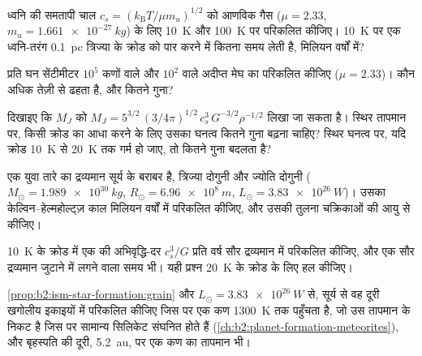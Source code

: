\begin{exercise}[$\star$]\label{exo:b2:ism-star-formation:3}
ध्वनि की समतापी चाल $c_s = (k_{\mathrm B}T/\mu m_u)^{1/2}$ को आणविक गैस
($\mu = 2.33$, $m_u = \qty{1.661e-27}{kg}$) के लिए \qty{10}{K} और \qty{100}{K} पर परिकलित कीजिए।
\qty{10}{K} पर एक ध्वनि-तरंग \qty{0.1}{pc} त्रिज्या के क्रोड को पार करने में
कितना समय लेती है, मिलियन वर्षों में?
\end{exercise}

\begin{exercise}[$\star$]\label{exo:b2:ism-star-formation:4}
प्रति घन सेंटीमीटर $10^5$ कणों वाले  और $10^2$ वाले अदीप्त
मेघ का  परिकलित कीजिए ($\mu = 2.33$)। कौन अधिक तेज़ी से ढहता है,
और कितने गुना?
\end{exercise}

\begin{exercise}[$\star\star$]\label{exo:b2:ism-star-formation:5}
दिखाइए कि $M_J$ को $M_J = 5^{3/2}\,(3/4\pi)^{1/2}\,c_s^3\,G^{-3/2}\rho^{-1/2}$ लिखा जा सकता है।
स्थिर तापमान पर, किसी क्रोड का  आधा करने के लिए उसका घनत्व कितने गुना बढ़ना चाहिए?
स्थिर घनत्व पर, यदि क्रोड \qty{10}{K} से \qty{20}{K} तक गर्म हो जाए, तो
 कितने गुना बदलता है?
\end{exercise}

\begin{exercise}[$\star\star$]\label{exo:b2:ism-star-formation:6}
एक युवा तारे का द्रव्यमान सूर्य के बराबर है, त्रिज्या दोगुनी और ज्योति दोगुनी
($M_\odot = \qty{1.989e30}{kg}$, $R_\odot = \qty{6.96e8}{m}$,
$L_\odot = \qty{3.83e26}{W}$)। उसका केल्विन--हेल्महोल्ट्ज़ काल मिलियन वर्षों में
परिकलित कीजिए, और उसकी तुलना चक्रिकाओं की आयु से कीजिए।
\end{exercise}

\begin{exercise}[$\star\star$]\label{exo:b2:ism-star-formation:7}
\qty{10}{K} के क्रोड में एक  की अभिवृद्धि-दर $c_s^3/G$ प्रति वर्ष सौर द्रव्यमान में
परिकलित कीजिए, और एक सौर द्रव्यमान जुटाने में लगने वाला समय भी। यही
प्रश्न \qty{20}{K} के क्रोड के लिए हल कीजिए।
\end{exercise}

\begin{exercise}[$\star\star$]\label{exo:b2:ism-star-formation:8}
\cref{prop:b2:ism-star-formation:grain} और $L_\odot = \qty{3.83e26}{W}$ से,
सूर्य से वह दूरी खगोलीय इकाइयों में परिकलित कीजिए जिस पर एक कण
\qty{1300}{K} तक पहुँचता है, जो उस तापमान के निकट है जिस पर सामान्य सिलिकेट
संघनित होते हैं (\cref{ch:b2:planet-formation-meteorites}), और
बृहस्पति की दूरी, \qty{5.2}{au}, पर एक कण का तापमान भी।
\end{exercise}

